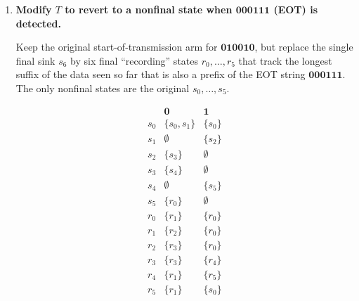 \begin{enumerate}[{4.}1.]
Let
\[
Q_0=\{s_0\},\quad
Q_1=\{s_0,s_1\},\quad
Q_2=\{s_0,s_2\},\quad
Q_3=\{s_0,s_1,s_3\},
\]
\[
Q_4=\{s_0,s_1,s_4\},\quad
Q_5=\{s_0,s_2,s_5\},\quad
Q_6=\{s_0,s_1,s_3,s_6\},
\]
\[
Q_7=\{s_0,s_1,s_4,s_6\},\quad
Q_8=\{s_0,s_2,s_6\},\quad
Q_9=\{s_0,s_1,s_6\},
\]
\[
Q_{10}=\{s_0,s_2,s_5,s_6\},\qquad
Q_{11}=\{s_0,s_6\}.
\]
These are exactly the reachable subsets from $\{s_0\}$ under Definition~4.5.
The accepting states are those containing $s_6$, namely
\[
Q_6,Q_7,Q_8,Q_9,Q_{10},Q_{11}.
\]
Their transitions are:
\[
\begin{array}{c|cc}
 & \pmb{0} & \pmb{1}\\\hline
Q_0 & Q_1 & Q_0\\
Q_1 & Q_1 & Q_2\\
Q_2 & Q_3 & Q_0\\
Q_3 & Q_4 & Q_2\\
Q_4 & Q_1 & Q_5\\
Q_5 & Q_6 & Q_0\\
Q_6 & Q_7 & Q_8\\
Q_7 & Q_9 & Q_{10}\\
Q_8 & Q_6 & Q_{11}\\
Q_9 & Q_9 & Q_8\\
Q_{10} & Q_6 & Q_{11}\\
Q_{11} & Q_9 & Q_{11}
\end{array}
\]
This is the connected part of $T^d$.

\item \textbf{Modify $T$ to revert to a nonfinal state when $\pmb{000111}$ (EOT) is detected.}

Keep the original start-of-transmission arm for $\pmb{010010}$, but replace the
single final sink $s_6$ by six final ``recording'' states $r_0,\dots,r_5$ that
track the longest suffix of the data seen so far that is also a prefix of the
EOT string $\pmb{000111}$.  The only nonfinal states are the original
$s_0,\dots,s_5$.

\[
\begin{array}{c|cc}
 & \pmb{0} & \pmb{1}\\\hline
s_0 & \{s_0,s_1\} & \{s_0\}\\
s_1 & \emptyset & \{s_2\}\\
s_2 & \{s_3\} & \emptyset\\
s_3 & \{s_4\} & \emptyset\\
s_4 & \emptyset & \{s_5\}\\
s_5 & \{r_0\} & \emptyset\\
r_0 & \{r_1\} & \{r_0\}\\
r_1 & \{r_2\} & \{r_0\}\\
r_2 & \{r_3\} & \{r_0\}\\
r_3 & \{r_3\} & \{r_4\}\\
r_4 & \{r_1\} & \{r_5\}\\
r_5 & \{r_1\} & \{s_0\}
\end{array}
\]


\end{enumerate}
